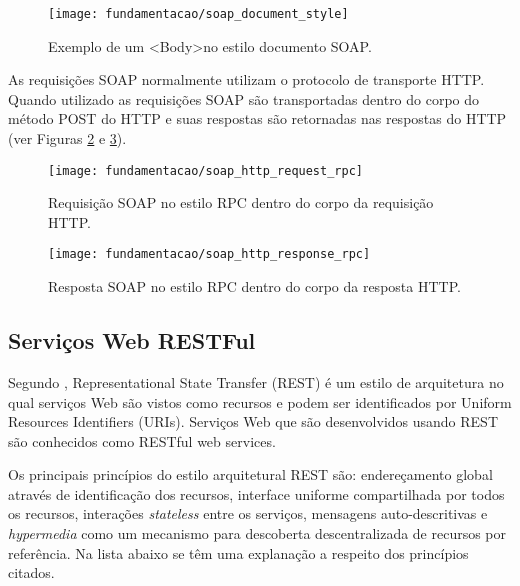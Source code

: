 \begin{figure}[!htb] \centering
  \centering
  \texttt{[image: fundamentacao/soap\_document\_style]} 
  \caption{Exemplo de um \textless Body\textgreater no estilo documento SOAP.\cite{Papazoglou:2008}} 
  \label{fig:wssoap_msg_soap_document}
\end{figure}

As requisições SOAP normalmente utilizam o protocolo de transporte HTTP. Quando utilizado as requisições SOAP são transportadas dentro do corpo do método POST do HTTP e suas respostas são retornadas nas respostas do HTTP (ver Figuras \ref{fig:wssoap_soap_http_request_rpc} e \ref{fig:wssoap_soap_http_response_rpc}).

\begin{figure}[!htb] \centering
  \centering
  \texttt{[image: fundamentacao/soap\_http\_request\_rpc]} 
  \caption{Requisição SOAP no estilo RPC dentro do corpo da requisição HTTP.\cite{Papazoglou:2008}} 
  \label{fig:wssoap_soap_http_request_rpc}
\end{figure}

\begin{figure}[!htb] \centering
  \centering
  \texttt{[image: fundamentacao/soap\_http\_response\_rpc]} 
  \caption{Resposta SOAP no estilo RPC dentro do corpo da resposta HTTP.\cite{Papazoglou:2008}} 
  \label{fig:wssoap_soap_http_response_rpc}
\end{figure}

\subsection{Serviços Web RESTFul}
\label{subsec:restful}
Segundo \cite{Heffelfinger:2014}, Representational State Transfer (REST) é um estilo de arquitetura no qual serviços Web são vistos como recursos e podem ser identificados por Uniform Resources Identifiers (URIs). Serviços Web que são desenvolvidos usando REST são conhecidos como RESTful web services. 

Os principais princípios do estilo arquitetural REST são: endereçamento global através de identificação dos recursos, interface uniforme compartilhada por todos os recursos, interações \textit{stateless} entre os serviços, mensagens auto-descritivas e \textit{hypermedia} como um mecanismo para descoberta descentralizada de recursos por referência\cite{Pautasso:2014}. Na lista abaixo se têm uma explanação a respeito dos princípios citados.

